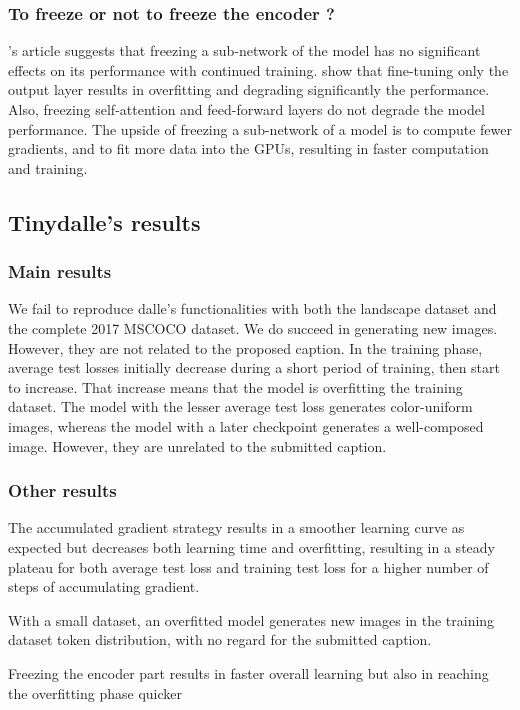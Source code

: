 \documentclass{article}
\begin{document}
\begin{multicols}{2}
\subsubsection{To freeze or not to freeze the encoder ?}

\citeauthor{Thompson_2018}'s article suggests that freezing a sub-network of the model has no significant effects on its performance with continued training. \cite{https://doi.org/10.48550/arxiv.2103.05247} show that fine-tuning only the output layer results in overfitting and degrading significantly the performance. Also, freezing self-attention and feed-forward layers do not degrade the model performance.
The upside of freezing a sub-network of a model is to compute fewer gradients, and to fit more data into the GPUs, resulting in faster computation and training.

\subsection{Tinydalle's results}\label{subsec:tinydalle_results}

\subsubsection{Main results}

We fail to reproduce \gls{dalle}'s functionalities with both the landscape dataset and the complete 2017 MSCOCO dataset. We do succeed in generating new images. However, they are not related to the proposed caption. In the training phase, average test losses initially decrease during a short period of training, then start to increase. That increase means that the model is overfitting the training dataset. The model with the lesser average test loss generates color-uniform images, whereas the model with a later checkpoint generates a well-composed image. However, they are unrelated to the submitted caption.

\subsubsection{Other results}

The accumulated gradient strategy results in a smoother learning curve as expected but decreases both learning time and overfitting, resulting in a steady plateau for both average test loss and training test loss for a higher number of steps of accumulating gradient.

With a small dataset, an overfitted model generates new images in the training dataset token distribution, with no regard for the submitted caption.

Freezing the encoder part results in faster overall learning but also in reaching the overfitting phase quicker

\end{multicols}
\end{document}
